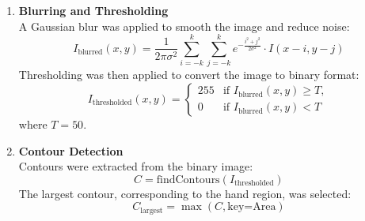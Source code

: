 \begin{enumerate}
    \item \textbf{Blurring and Thresholding} \\
    A Gaussian blur was applied to smooth the image and reduce noise:
    \[
    I_{\text{blurred}}(x, y) = \frac{1}{2\pi\sigma^2} \sum_{i=-k}^{k} \sum_{j=-k}^{k} e^{-\frac{i^2 + j^2}{2\sigma^2}} \cdot I(x-i, y-j)
    \]
    Thresholding was then applied to convert the image to binary format:
    \[
    I_{\text{thresholded}}(x, y) =
    \begin{cases}
    255 & \text{if } I_{\text{blurred}}(x, y) \geq T, \\
    0 & \text{if } I_{\text{blurred}}(x, y) < T
    \end{cases}
    \]
    where \( T = 50 \).

    \item \textbf{Contour Detection} \\
    Contours were extracted from the binary image:
    \[
    C = \text{findContours}(I_{\text{thresholded}})
    \]
    The largest contour, corresponding to the hand region, was selected:
    \[
    C_{\text{largest}} = \max(C, \text{key=Area})
    \]


\end{enumerate}
